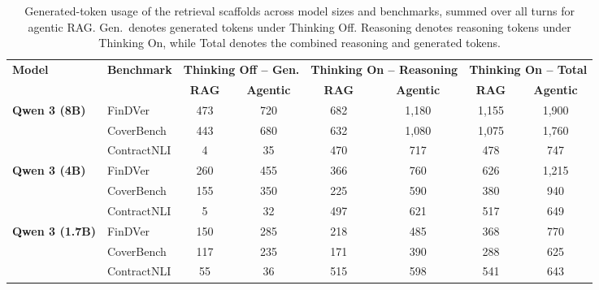 \documentclass[11pt]{article}
\begin{document}
\begin{table}[H]
\centering
\scriptsize
\setlength{\tabcolsep}{4pt}
\renewcommand{\arraystretch}{1.08}

\begin{tabular}{llcc|cc|cc}
\toprule
\multirow{2}{*}{\textbf{Model}} &
\multirow{2}{*}{\textbf{Benchmark}} &
\multicolumn{2}{c|}{\textbf{Thinking Off -- Gen.}} &
\multicolumn{2}{c|}{\textbf{Thinking On -- Reasoning}} &
\multicolumn{2}{c}{\textbf{Thinking On -- Total}} \\
\cmidrule(lr){3-4}
\cmidrule(lr){5-6}
\cmidrule(lr){7-8}
& &
\textbf{RAG} & \textbf{Agentic} &
\textbf{RAG} & \textbf{Agentic} &
\textbf{RAG} & \textbf{Agentic} \\
\midrule
\multirow{3}{*}{\textbf{Qwen 3 (8B)}}
& FinDVer     & 473 & 720 & 682 & 1{,}180 & 1{,}155 & 1{,}900 \\
& CoverBench  & 443 & 680 & 632 & 1{,}080 & 1{,}075 & 1{,}760 \\
& ContractNLI & 4   & 35  & 470 & 717     & 478     & 747 \\
\midrule
\multirow{3}{*}{\textbf{Qwen 3 (4B)}}
& FinDVer     & 260 & 455 & 366 & 760 & 626 & 1{,}215 \\
& CoverBench  & 155 & 350 & 225 & 590 & 380 & 940 \\
& ContractNLI & 5   & 32  & 497 & 621 & 517 & 649 \\
\midrule
\multirow{3}{*}{\textbf{Qwen 3 (1.7B)}}
& FinDVer     & 150 & 285 & 218 & 485 & 368 & 770 \\
& CoverBench  & 117 & 235 & 171 & 390 & 288 & 625 \\
& ContractNLI & 55  & 36  & 515 & 598 & 541 & 643 \\
\bottomrule
\end{tabular}

\caption{Generated-token usage of the retrieval scaffolds across model
sizes and benchmarks, summed over all turns for agentic RAG. Gen.\ denotes
generated tokens under Thinking Off. Reasoning denotes reasoning tokens
under Thinking On, while Total denotes the combined reasoning and generated
tokens.}
\label{tab:rag_tokens}
\end{table}
\end{document}
